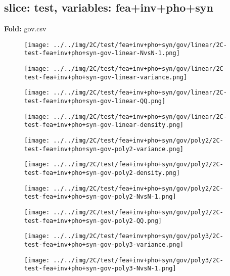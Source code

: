 \subsection{slice: test, variables: fea+inv+pho+syn}
\textbf{Fold:} gov.csv
\begin{figure}[H]
\centering	\texttt{[image: ../../img/2C/test/fea+inv+pho+syn/gov/linear/2C-test-fea+inv+pho+syn-gov-linear-NvsN-1.png]}
\end{figure}
\begin{figure}[H]
\centering	\texttt{[image: ../../img/2C/test/fea+inv+pho+syn/gov/linear/2C-test-fea+inv+pho+syn-gov-linear-variance.png]}
\end{figure}
\begin{figure}[H]
\centering	\texttt{[image: ../../img/2C/test/fea+inv+pho+syn/gov/linear/2C-test-fea+inv+pho+syn-gov-linear-QQ.png]}
\end{figure}
\begin{figure}[H]
\centering	\texttt{[image: ../../img/2C/test/fea+inv+pho+syn/gov/linear/2C-test-fea+inv+pho+syn-gov-linear-density.png]}
\end{figure}
\begin{figure}[H]
\centering	\texttt{[image: ../../img/2C/test/fea+inv+pho+syn/gov/poly2/2C-test-fea+inv+pho+syn-gov-poly2-variance.png]}
\end{figure}
\begin{figure}[H]
\centering	\texttt{[image: ../../img/2C/test/fea+inv+pho+syn/gov/poly2/2C-test-fea+inv+pho+syn-gov-poly2-density.png]}
\end{figure}
\begin{figure}[H]
\centering	\texttt{[image: ../../img/2C/test/fea+inv+pho+syn/gov/poly2/2C-test-fea+inv+pho+syn-gov-poly2-NvsN-1.png]}
\end{figure}
\begin{figure}[H]
\centering	\texttt{[image: ../../img/2C/test/fea+inv+pho+syn/gov/poly2/2C-test-fea+inv+pho+syn-gov-poly2-QQ.png]}
\end{figure}
\begin{figure}[H]
\centering	\texttt{[image: ../../img/2C/test/fea+inv+pho+syn/gov/poly3/2C-test-fea+inv+pho+syn-gov-poly3-variance.png]}
\end{figure}
\begin{figure}[H]
\centering	\texttt{[image: ../../img/2C/test/fea+inv+pho+syn/gov/poly3/2C-test-fea+inv+pho+syn-gov-poly3-NvsN-1.png]}
\end{figure}
